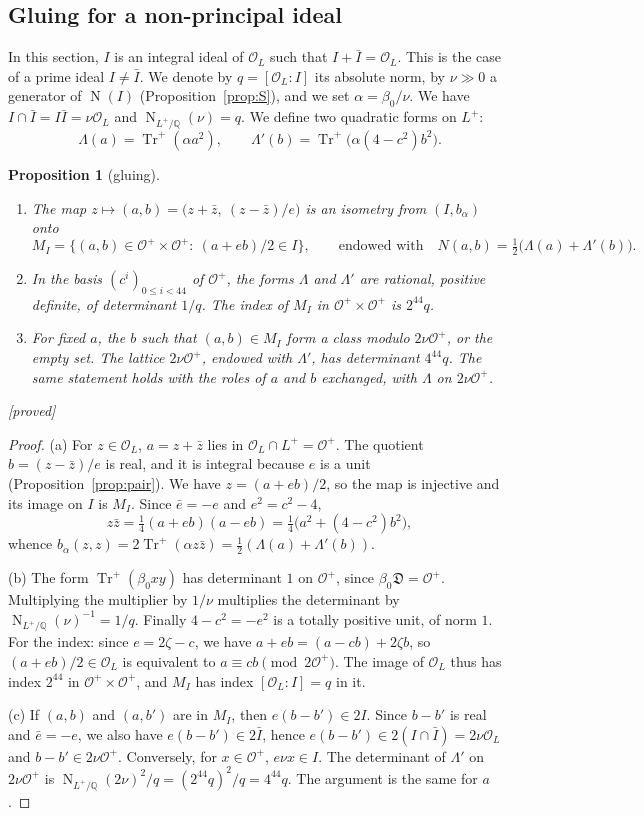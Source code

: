 \documentclass[11pt,a4paper]{amsart}
\theoremstyle{plain}
\newtheorem{proposition}[theorem]{Proposition}
\theoremstyle{definition}
\numberwithin{equation}{section}
\newcommand{\Q}{\mathbb{Q}}
\newcommand{\OO}{\mathcal{O}}
\newcommand{\Op}{\mathcal{O}^{+}}
\newcommand{\Dif}{\mathfrak{D}}
\DeclareMathOperator{\Tr}{Tr}
\DeclareMathOperator{\Nm}{N}
\newcommand{\Trp}{\Tr^{+}}
\newcommand{\st}[1]{\textup{\textsf{\small[#1]}}}
\newcommand{\DEM}{\st{proved}}
\begin{document}
\subsection{Gluing for a non-principal ideal}
In this section, $I$ is an integral ideal of $\OO_L$ such that $I+\bar I=\OO_L$. This is the case of a prime ideal $I\ne\bar I$. We denote by $q=[\OO_L:I]$ its absolute norm, by $\nu\gg0$ a generator of $\Nm(I)$ (Proposition~\ref{prop:S}), and we set $\alpha=\beta_0/\nu$. We have $I\cap\bar I=I\bar I=\nu\OO_L$ and $\Nm_{L^+/\Q}(\nu)=q$. We define two quadratic forms on $L^+$:
\[
\Lambda(a)=\Trp(\alpha a^2),\qquad \Lambda'(b)=\Trp\bigl(\alpha(4-c^2)b^2\bigr).
\]

\begin{proposition}[gluing]\label{prop:recollement}
\begin{enumerate}[label=\textup{(\alph*)}]
\item The map $z\mapsto(a,b)=\bigl(z+\bar z,\ (z-\bar z)/e\bigr)$ is an isometry from $(I,b_\alpha)$ onto
\[
M_I=\bigl\{(a,b)\in\Op\times\Op:\ (a+eb)/2\in I\bigr\},\qquad \text{endowed with}\quad N(a,b)=\tfrac12\bigl(\Lambda(a)+\Lambda'(b)\bigr).
\]
\item In the basis $(c^{i})_{0\le i<44}$ of $\Op$, the forms $\Lambda$ and $\Lambda'$ are rational, positive definite, of determinant $1/q$. The index of $M_I$ in $\Op\times\Op$ is $2^{44}q$.
\item For fixed $a$, the $b$ such that $(a,b)\in M_I$ form a class modulo $2\nu\Op$, or the empty set. The lattice $2\nu\Op$, endowed with $\Lambda'$, has determinant $4^{44}q$. The same statement holds with the roles of $a$ and $b$ exchanged, with $\Lambda$ on $2\nu\Op$.
\end{enumerate}
\DEM
\end{proposition}

\begin{proof}
(a) For $z\in\OO_L$, $a=z+\bar z$ lies in $\OO_L\cap L^+=\Op$. The quotient $b=(z-\bar z)/e$ is real, and it is integral because $e$ is a unit (Proposition~\ref{prop:pair}). We have $z=(a+eb)/2$, so the map is injective and its image on $I$ is $M_I$. Since $\bar e=-e$ and $e^2=c^2-4$,
\[
z\bar z=\tfrac14(a+eb)(a-eb)=\tfrac14\bigl(a^2+(4-c^2)b^2\bigr),
\]
whence $b_\alpha(z,z)=2\Trp(\alpha z\bar z)=\frac12(\Lambda(a)+\Lambda'(b))$.

(b) The form $\Trp(\beta_0xy)$ has determinant $1$ on $\Op$, since $\beta_0\Dif=\Op$. Multiplying the multiplier by $1/\nu$ multiplies the determinant by $\Nm_{L^+/\Q}(\nu)^{-1}=1/q$. Finally $4-c^2=-e^2$ is a totally positive unit, of norm $1$. For the index: since $e=2\zeta-c$, we have $a+eb=(a-cb)+2\zeta b$, so $(a+eb)/2\in\OO_L$ is equivalent to $a\equiv cb\pmod{2\Op}$. The image of $\OO_L$ thus has index $2^{44}$ in $\Op\times\Op$, and $M_I$ has index $[\OO_L:I]=q$ in it.

(c) If $(a,b)$ and $(a,b')$ are in $M_I$, then $e(b-b')\in2I$. Since $b-b'$ is real and $\bar e=-e$, we also have $e(b-b')\in2\bar I$, hence $e(b-b')\in2(I\cap\bar I)=2\nu\OO_L$ and $b-b'\in2\nu\Op$. Conversely, for $x\in\Op$, $e\nu x\in I$. The determinant of $\Lambda'$ on $2\nu\Op$ is $\Nm_{L^+/\Q}(2\nu)^2/q=(2^{44}q)^2/q=4^{44}q$. The argument is the same for $a$.
\end{proof}
\end{document}
